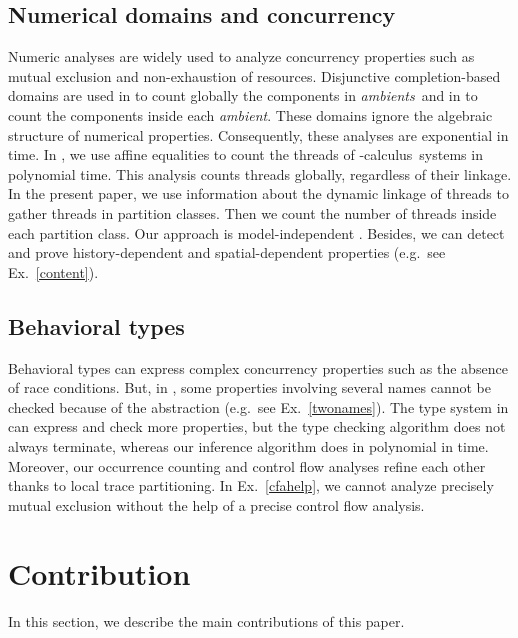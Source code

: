 \documentclass{article}
\newcommand{\picalcul}{-calculus}
\newcommand{\ambient}{\emph{ambient}}
\newcommand{\ambients}{\emph{ambients}}
\begin{document}
\subsection{Numerical domains and concurrency}
Numeric analyses are widely used to analyze concurrency properties such as mutual exclusion and non-exhaustion of resources.
Disjunctive completion-based domains are used  in \cite{HJNN99ai} to count globally the components in \ambients\ and  in \cite{NiNi00popl,gori:aplas} to count the components inside each \ambient. 
These domains ignore the algebraic structure of numerical properties. 
Consequently, these analyses are exponential in time.
In \cite{feret:jlap,feret:getco2000}, we use affine equalities to count the threads of \picalcul\ systems  in polynomial time.
This analysis counts threads globally, regardless of their linkage. 
In the present paper, we  use information about the dynamic linkage of threads to gather threads in partition classes. Then we count the number of threads inside each partition class. Our approach is model-independent \cite{feret:thesis}.
Besides, we can detect and prove history-dependent and spatial-dependent properties (e.g.~see Ex.~\ref{content}).
\subsection{Behavioral types}
Behavioral types can express complex concurrency properties such as the absence of race conditions. 
But, in \cite{igarashi.kobayashi:generic-type}, some properties involving several names  cannot be checked because of the abstraction (e.g.~see Ex.~\ref{twonames}). 
The type system in \cite{rajamani.rehof:behavioral-module,rehofpopl02} can express and check more properties, but the type checking algorithm does not always terminate, whereas our inference algorithm  does in polynomial in time.
Moreover, 
our occurrence counting and control flow analyses refine each other thanks to local trace partitioning. 
In Ex.~\ref{cfahelp}, we cannot analyze precisely mutual exclusion without the help of a precise control flow analysis.

\section{Contribution}
\label{contribution}
In this section, we describe the main contributions of this paper. 
\end{document}
